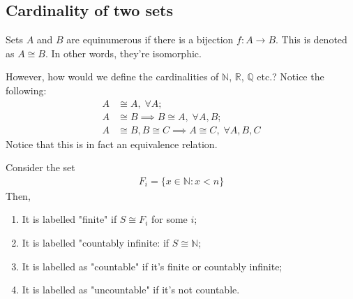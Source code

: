 \documentclass[a4paper]{article}
\theoremstyle{plain}
\theoremstyle{definition}
\newtheorem{defn}{Definition}[section]
\theoremstyle{remark}
\begin{document}
\subsection{Cardinality of two sets}
\begin{tcolorbox}[colback=black!3!white,colframe=black!60!white,title=\begin{defn}Equinumerosity \label{Equinumerosity}\end{defn}]
Sets $A$ and $B$ are equinumerous if there is a bijection $f: A \to B$. This is denoted as $A \cong B$. In other words, they're isomorphic. 
\end{tcolorbox}
However, how would we define the cardinalities of $\mathbb{N}$, $\mathbb{R}$, $\mathbb{Q}$ etc.?
Notice the following:
\begin{align*}
	A &\cong A, \; \forall A; \\
	A &\cong B \implies B \cong A, \; \forall A,B; \\
	A &\cong B, B \cong C \implies A \cong C, \; \forall A,B,C
\end{align*}
Notice that this is in fact an equivalence relation.
\begin{tcolorbox}[colback=black!3!white,colframe=black!60!white,title=\begin{defn}Countability \label{Countability}\end{defn}]
Consider the set
\begin{align*}
	F_i = \{ x \in \mathbb{N} : x < n \}
\end{align*}
Then,
\begin{enumerate}
	\item It is labelled "finite" if $S \cong F_i$ for some $i$;
	\item It is labelled "countably infinite: if $S \cong \mathbb{N}$;
	\item It is labelled as "countable" if it's finite or countably infinite;
	\item It is labelled as "uncountable" if it's not countable.
\end{enumerate}
\end{tcolorbox}
\end{document}
